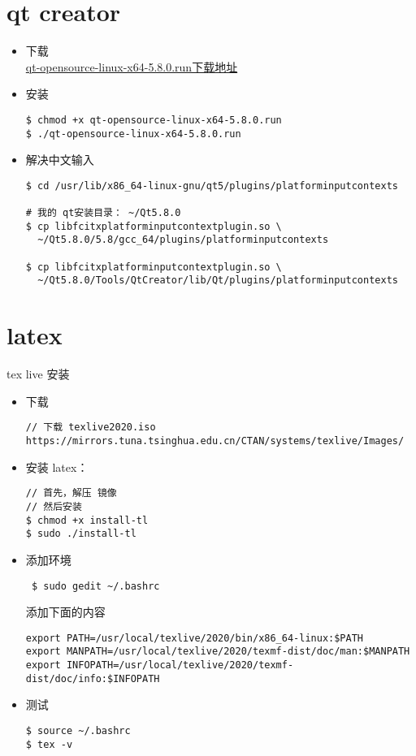 \section{qt creator}
\begin{itemize}
\item 下载 \\
\href{http://iso.mirrors.ustc.edu.cn/qtproject/archive/qt/5.8/5.8.0/qt-opensource-linux-x64-5.8.0.run}{qt-opensource-linux-x64-5.8.0.run下载地址}

\item 安装
\begin{lstlisting}
$ chmod +x qt-opensource-linux-x64-5.8.0.run 
$ ./qt-opensource-linux-x64-5.8.0.run 
\end{lstlisting}

\item 解决中文输入
\begin{lstlisting}
$ cd /usr/lib/x86_64-linux-gnu/qt5/plugins/platforminputcontexts

# 我的 qt安装目录： ~/Qt5.8.0
$ cp libfcitxplatforminputcontextplugin.so \
  ~/Qt5.8.0/5.8/gcc_64/plugins/platforminputcontexts

$ cp libfcitxplatforminputcontextplugin.so \
  ~/Qt5.8.0/Tools/QtCreator/lib/Qt/plugins/platforminputcontexts
\end{lstlisting}
\end{itemize}
\newpage

\section{latex}
tex live 安装 \\

\begin{itemize}
\item 下载
\begin{lstlisting}
// 下载 texlive2020.iso
https://mirrors.tuna.tsinghua.edu.cn/CTAN/systems/texlive/Images/
\end{lstlisting}

\item 安装 latex：
\begin{lstlisting}
// 首先，解压 镜像
// 然后安装
$ chmod +x install-tl
$ sudo ./install-tl
\end{lstlisting}

\item 添加环境
 \begin{lstlisting}
 $ sudo gedit ~/.bashrc
 \end{lstlisting}
  
添加下面的内容
\begin{lstlisting}
export PATH=/usr/local/texlive/2020/bin/x86_64-linux:$PATH
export MANPATH=/usr/local/texlive/2020/texmf-dist/doc/man:$MANPATH
export INFOPATH=/usr/local/texlive/2020/texmf-dist/doc/info:$INFOPATH
\end{lstlisting}

\item 测试
\begin{lstlisting}
$ source ~/.bashrc
$ tex -v
\end{lstlisting}
\end{itemize}
\newpage


